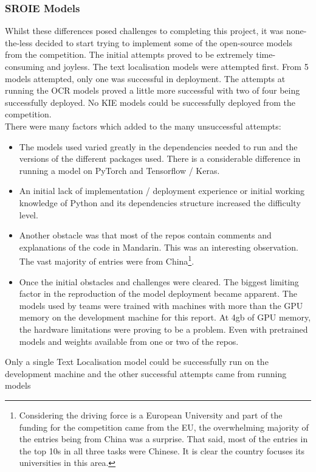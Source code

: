 \subsubsection{SROIE Models}
Whilst these differences posed challenges to completing this project, it was none-the-less decided to start trying to implement some of the open-source models
from the competition. The initial attempts proved to be extremely time-consuming and joyless. The text localisation models were attempted first. From
5 models attempted, only one was successful in deployment.
\bigbreak
The attempts at running the OCR models proved a little more successful with two of four being successfully deployed. No KIE models could be successfully
deployed from the competition.\\
There were many factors which added to the many unsuccessful attempts:
\begin{itemize}
	\item The models used varied greatly in the dependencies needed to run and the versions of the different packages used. There is a considerable
	      difference in running a model on PyTorch and Tensorflow / Keras.
	\item An initial lack of implementation / deployment experience or initial working knowledge of Python and its dependencies structure
	      increased the difficulty level.
	\item Another obstacle was that most of the repos contain comments and explanations of the code in Mandarin. This was an interesting observation.
	      The vast majority of entries were from China\footnote{Considering the driving force is a European University and part of the funding for the competition came
		      from the EU, the overwhelming majority of the entries being from China was a surprise. That said, most of the entries in the top 10s in all three tasks
		      were Chinese. It is clear the country focuses its universities in this area.}.
	\item Once the initial obstacles and challenges were cleared. The biggest limiting factor in the reproduction of the model deployment became apparent.
	      The models used by teams were trained with machines with more than the GPU memory on the development machine for this report. At 4gb of GPU memory, the
	      hardware limitations were proving to be a problem. Even with pretrained models and weights available from one or two of the repos.
\end{itemize}
Only a single Text Localisation model could be successfully run on the development machine and the other successful attempts came from running models
